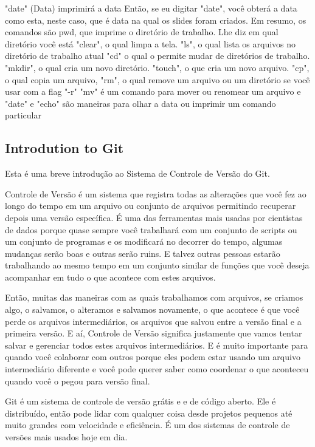 "date" (Data) imprimirá a data Então, se eu digitar "date", você obterá a data como esta, neste caso, que é data na qual os slides foram criados. Em resumo, os comandos são pwd, que imprime o diretório de trabalho. Lhe diz em qual diretório você está "clear", o qual limpa a tela. "ls", o qual lista os arquivos no diretório de trabalho atual "cd" o qual o permite mudar de diretórios de trabalho. "mkdir", o qual cria um novo diretório. "touch", o que cria um novo arquivo. "cp", o qual copia um arquivo, "rm", o qual remove um arquivo ou um diretório se você usar com a flag "-r" "mv" é um comando para mover ou renomear um arquivo e "date" e "echo" são maneiras para olhar a data ou imprimir um comando particular


\subsection{Introdution to Git}

Esta é uma breve introdução ao Sistema de Controle de Versão do Git. 

Controle de Versão é um sistema que registra todas as alterações que você fez ao longo do tempo em um arquivo ou conjunto de arquivos permitindo recuperar depois uma versão específica. É uma das ferramentas mais usadas por cientistas de dados porque quase sempre você trabalhará com um conjunto de scripts ou um conjunto de programas e os modificará no decorrer do tempo, algumas mudanças serão boas e outras serão ruins. E talvez outras pessoas estarão trabalhando ao mesmo tempo em um conjunto similar de funções que você deseja acompanhar em tudo o que acontece com estes arquivos. 

Então, muitas das maneiras com as quais trabalhamos com arquivos, se criamos algo, o salvamos, o alteramos e salvamos novamente, o que acontece é que você perde os arquivos intermediários, os arquivos que salvou entre a versão final e a primeira versão. E aí, Controle de Versão significa justamente que vamos tentar salvar e gerenciar todos estes arquivos intermediários. E é muito importante para quando você colaborar com outros porque eles podem estar usando um arquivo intermediário diferente e você pode querer saber como coordenar o que aconteceu quando você o pegou para versão final. 

Git é um sistema de controle de versão grátis e e de código aberto. Ele é distribuído, então pode lidar com qualquer coisa  desde projetos pequenos até muito grandes com velocidade e eficiência. É um dos sistemas de controle de versões mais usados hoje em dia. 


